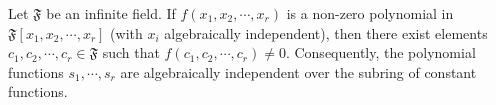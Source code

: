Let $\mathfrak{F}$ be an infinite field. If $f(x_1, x_2, \cdots, x_r)$ is a non-zero polynomial in $\mathfrak{F}[x_1, x_2, \cdots, x_r]$ (with $x_i$ algebraically independent), then there exist elements $c_1, c_2, \cdots, c_r \in \mathfrak{F}$ such that $f(c_1, c_2, \cdots, c_r) \neq 0$. Consequently, the polynomial functions $s_1, \cdots, s_r$ are algebraically independent over the subring of constant functions.

